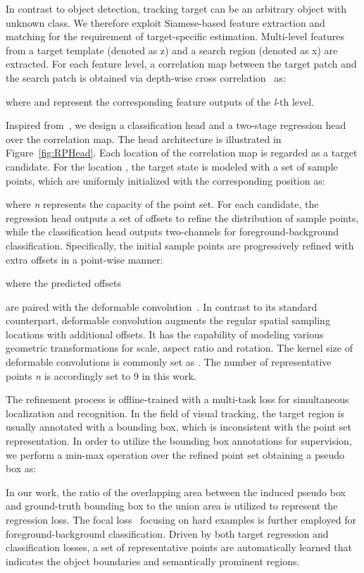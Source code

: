 \documentclass[runningheads]{llncs}
\begin{document}
In contrast to object detection, tracking target can be an arbitrary object with unknown class. We therefore exploit Siamese-based feature extraction and matching for the requirement of target-specific estimation. Multi-level features from a target template (denoted as z)
and a search region (denoted as x) are extracted. For each feature level, a correlation map between the target patch and the search patch
is obtained via depth-wise cross correlation~\cite{siamrpn++} as:


where  and 
represent the corresponding feature outputs of the \emph{l}-th level.

Inspired from~\cite{reppoints}, we design a classification head and a two-stage
regression head over the correlation map. The head architecture is illustrated in Figure~\ref{fig:RPHead}.
Each location of the correlation map is regarded as a target candidate. For the location , the target state is modeled with a set of sample points, which are
uniformly initialized with the corresponding position as:




where \emph{n} represents the capacity of the point set. For each candidate, the regression head outputs a set of offsets to refine the
distribution of sample points, while the classification head
outputs two-channels for foreground-background classification. Specifically, the initial sample points are progressively refined
with extra offsets in a point-wise manner:


where the predicted offsets

are paired with the deformable convolution~\cite{Dconv}. In contrast to
its standard counterpart, deformable convolution augments the regular
spatial sampling locations with additional offsets. It has the
capability of modeling various geometric transformations for scale,
aspect ratio and rotation. The kernel size of deformable convolutions is commonly set as . The number of representative points \emph{n} is accordingly set to 9 in this work.

The refinement process is offline-trained with a multi-task loss for
simultaneous localization and recognition. In the field of visual
tracking, the target region is usually annotated with a bounding box,
which is inconsistent with the point set representation. In order to
utilize the bounding box annotations for supervision, we perform a
min-max operation over the refined point set obtaining a pseudo
box as:



In our work, the ratio of the overlapping area between the induced
pseudo box and ground-truth bounding box to the union area is utilized
to represent the regression loss. The focal loss~\cite{focalloss} focusing on hard
examples is further employed for foreground-background classification.
Driven by both target regression and classification losses, a set of
representative points are automatically learned that indicates the
object boundaries and semantically prominent regions.
\end{document}
